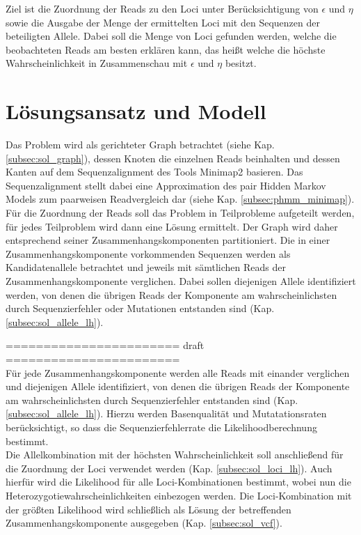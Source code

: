 Ziel ist die Zuordnung der Reads zu den Loci unter Berücksichtigung von $\epsilon$ und $\eta$ sowie die Ausgabe der Menge der ermittelten Loci mit den Sequenzen der beteiligten Allele. Dabei soll die Menge von Loci gefunden werden, welche die beobachteten Reads am besten erklären kann, das heißt welche die höchste Wahrscheinlichkeit in Zusammenschau mit $\epsilon$ und $\eta$ besitzt. \\

\section{Lösungsansatz und Modell} \label{sec:solution}

Das Problem wird als gerichteter Graph betrachtet (siehe Kap. \ref{subsec:sol_graph}), dessen Knoten die einzelnen Reads beinhalten und dessen Kanten auf dem Sequenzalignment des Tools Minimap2 basieren. Das Sequenzalignment stellt dabei eine Approximation des pair Hidden Markov Models zum paarweisen Readvergleich dar (siehe Kap. \ref{subsec:phmm_minimap}).  \\

Für die Zuordnung der Reads soll das Problem in Teilprobleme aufgeteilt werden, für jedes Teilproblem wird dann eine Lösung ermittelt. Der Graph wird daher entsprechend seiner Zusammenhangskomponenten partitioniert. Die in einer Zusammenhangskomponente vorkommenden Sequenzen werden als Kandidatenallele betrachtet und jeweils mit sämtlichen Reads der Zusammenhangskomponente verglichen. Dabei sollen diejenigen Allele identifiziert werden, von denen die übrigen Reads der Komponente am wahrscheinlichsten durch Sequenzierfehler oder Mutationen entstanden sind (Kap. \ref{subsec:sol_allele_lh}). 

\noindent======================= draft =======================\\

Für jede Zusammenhangskomponente werden alle Reads mit einander verglichen und diejenigen Allele identifiziert, von denen die übrigen Reads der Komponente am wahrscheinlichsten durch Sequenzierfehler entstanden sind (Kap. \ref{subsec:sol_allele_lh}). Hierzu werden Basenqualität und Mutatationsraten berücksichtigt, so dass die Sequenzierfehlerrate die Likelihoodberechnung bestimmt. \\

Die Allelkombination mit der höchsten Wahrscheinlichkeit soll anschließend für die Zuordnung der Loci verwendet werden (Kap. \ref{subsec:sol_loci_lh}). Auch hierfür wird die Likelihood für alle Loci-Kombinationen bestimmt, wobei nun die Heterozygotiewahrscheinlichkeiten einbezogen werden. Die Loci-Kombination mit der größten Likelihood wird schließlich als Lösung der betreffenden Zusammenhangskomponente ausgegeben (Kap. \ref{subsec:sol_vcf}).\\

